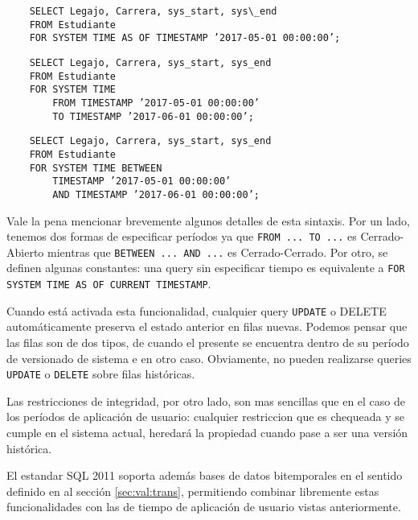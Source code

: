 \begin{verbatim}
    SELECT Legajo, Carrera, sys_start, sys\_end
    FROM Estudiante
    FOR SYSTEM TIME AS OF TIMESTAMP ’2017-05-01 00:00:00’;
\end{verbatim}

\begin{verbatim}
    SELECT Legajo, Carrera, sys_start, sys_end
    FROM Estudiante
    FOR SYSTEM TIME
        FROM TIMESTAMP ’2017-05-01 00:00:00’
        TO TIMESTAMP ’2017-06-01 00:00:00’;
\end{verbatim}


\begin{verbatim}
    SELECT Legajo, Carrera, sys_start, sys_end
    FROM Estudiante
    FOR SYSTEM TIME BETWEEN
        TIMESTAMP ’2017-05-01 00:00:00’
        AND TIMESTAMP ’2017-06-01 00:00:00’;
\end{verbatim}

Vale la pena mencionar brevemente algunos detalles de esta sintaxis.
Por un lado, tenemos dos formas de especificar períodos ya que \texttt{FROM ... TO ...} es Cerrado-Abierto
mientras que \texttt{BETWEEN ... AND ...} es Cerrado-Cerrado.
Por otro, se definen algunas constantes:
una query sin especificar tiempo es equivalente a \texttt{FOR SYSTEM TIME AS OF CURRENT TIMESTAMP}.

Cuando está activada esta funcionalidad, cualquier query \texttt{UPDATE} o DELETE automáticamente preserva el estado anterior en filas nuevas.
Podemos pensar que las filas son de dos tipos,
de  cuando el presente se encuentra dentro de su período de versionado de sistema
e  en otro caso.
Obviamente, no pueden realizarse queries \texttt{UPDATE} o \texttt{DELETE} sobre filas históricas.

Las restricciones de integridad, por otro lado, son mas sencillas que en el caso de los períodos de aplicación de usuario:
cualquier restriccion que es chequeada y se cumple en el sistema actual, heredará la propiedad cuando pase a ser una versión histórica.

El estandar SQL 2011 soporta además bases de datos bitemporales en el sentido definido en al sección \ref{sec:val:trans},
permitiendo combinar libremente estas funcionalidades con las de tiempo de aplicación de usuario vistas anteriormente.